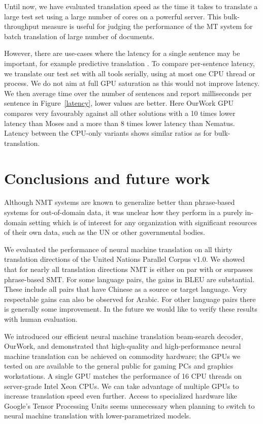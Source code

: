 \documentclass[11pt]{article}
\begin{document}
Until now, we have evaluated translation speed as the time it takes to translate a large test set using a large number of cores on a powerful server. This bulk-throughput measure is useful for judging the performance of the MT system for batch translation of large number of documents.
 
However, there are use-cases where the latency for a single sentence may be important, for example predictive translation \cite{Knowles}. 
To compare per-sentence latency, we translate our test set with all tools serially, using at most one CPU thread or process. We do not aim at full GPU saturation as this would not improve latency. We then average time over the number of sentences and report milliseconds per sentence in Figure~\ref{latency}, lower values are better. Here OurWork GPU compares very favourably against all other solutions with a 10 times lower latency than Moses and a more than 8 times lower latency than Nematus. Latency between the CPU-only variants shows similar ratios as for bulk-translation. 

\section{Conclusions and future work}

Although NMT systems are known to generalize better than phrase-based systems for out-of-domain data, it was unclear how they perform in a purely in-domain setting which is of interest for any organization with significant resources of their own data, such as the UN or other governmental bodies.

We evaluated the performance of neural machine translation on all thirty translation directions of the United Nations Parallel Corpus v1.0. We showed that for nearly all translation directions NMT is either on par with or surpasses phrase-based SMT. For some language pairs, the gains in BLEU are substantial. These include all pairs that have Chinese as a source or target language. Very respectable gains can also be observed for Arabic. For other language pairs there is generally some improvement.  In the future we would like to verify these results with human evaluation.

We introduced our efficient neural machine translation beam-search decoder, OurWork, and demonstrated that high-quality and high-performance neural machine translation can be achieved on commodity hardware; the GPUs we tested on are available to the general public for gaming PCs and graphics workstations. A single GPU matches the performance of 16 CPU threads on server-grade Intel Xeon CPUs. We can take advantage of multiple GPUs to increase translation speed even further. Access to specialized hardware like Google's Tensor Processing Units seems unnecessary when planning to switch to neural machine translation with lower-parametrized models. 
\end{document}
